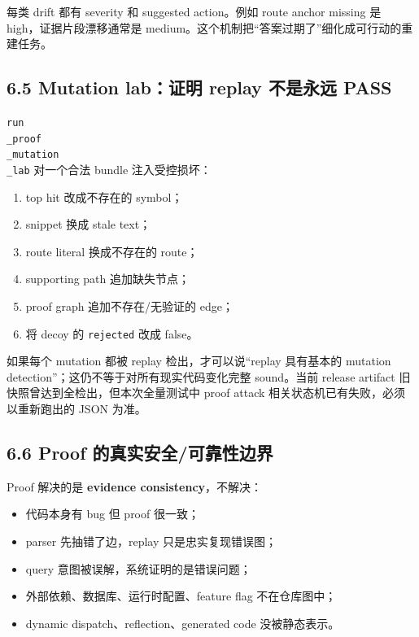 \documentclass[UTF8,12pt,openany]{ctexbook}
\begin{document}
每类 drift 都有 severity 和 suggested action。例如 route anchor missing 是 high，证据片段漂移通常是 medium。这个机制把“答案过期了”细化成可行动的重建任务。\par

\subsection{6.5 Mutation lab：证明 replay 不是永远 PASS}

\texttt{run\\_proof\\_mutation\\_lab} 对一个合法 bundle 注入受控损坏：\par

\begin{enumerate}
\item top hit 改成不存在的 symbol；
\item snippet 换成 stale text；
\item route literal 换成不存在的 route；
\item supporting path 追加缺失节点；
\item proof graph 追加不存在/无验证的 edge；
\item 将 decoy 的 \texttt{rejected} 改成 false。
\end{enumerate}

如果每个 mutation 都被 replay 检出，才可以说“replay 具有基本的 mutation detection”；这仍不等于对所有现实代码变化完整 sound。当前 release artifact 旧快照曾达到全检出，但本次全量测试中 proof attack 相关状态机已有失败，必须以重新跑出的 JSON 为准。\par

\subsection{6.6 Proof 的真实安全/可靠性边界}

Proof 解决的是 \textbf{evidence consistency}，不解决：\par

\begin{itemize}
\item 代码本身有 bug 但 proof 很一致；
\item parser 先抽错了边，replay 只是忠实复现错误图；
\item query 意图被误解，系统证明的是错误问题；
\item 外部依赖、数据库、运行时配置、feature flag 不在仓库图中；
\item dynamic dispatch、reflection、generated code 没被静态表示。
\end{itemize}
\end{document}
